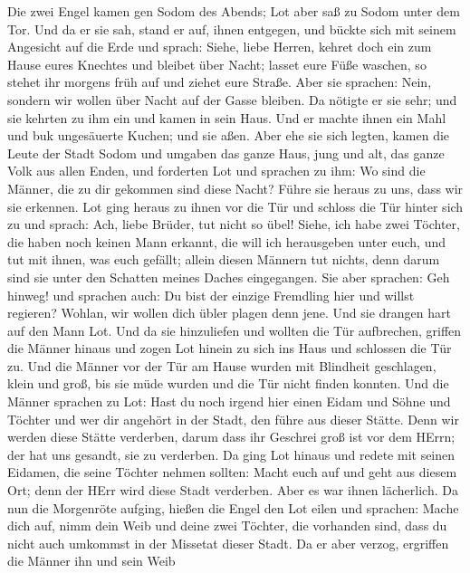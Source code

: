  Die zwei Engel kamen gen Sodom des Abends; Lot aber saß zu
Sodom unter dem Tor. Und da er sie sah, stand er auf, ihnen entgegen,
und bückte sich mit seinem Angesicht auf die Erde  und
sprach: Siehe, liebe Herren, kehret doch ein zum Hause eures Knechtes
und bleibet über Nacht; lasset eure Füße waschen, so stehet ihr morgens
früh auf und ziehet eure Straße. Aber sie sprachen: Nein, sondern wir
wollen über Nacht auf der Gasse bleiben.  Da nötigte er sie
sehr; und sie kehrten zu ihm ein und kamen in sein Haus. Und er machte
ihnen ein Mahl und buk ungesäuerte Kuchen; und sie aßen. 
Aber ehe sie sich legten, kamen die Leute der Stadt Sodom und umgaben
das ganze Haus, jung und alt, das ganze Volk aus allen Enden,
 und forderten Lot und sprachen zu ihm: Wo sind die Männer,
die zu dir gekommen sind diese Nacht? Führe sie heraus zu uns, dass wir
sie erkennen.  Lot ging heraus zu ihnen vor die Tür und
schloss die Tür hinter sich zu  und sprach: Ach, liebe
Brüder, tut nicht so übel!  Siehe, ich habe zwei Töchter,
die haben noch keinen Mann erkannt, die will ich herausgeben unter euch,
und tut mit ihnen, was euch gefällt; allein diesen Männern tut nichts,
denn darum sind sie unter den Schatten meines Daches eingegangen.
 Sie aber sprachen: Geh hinweg! und sprachen auch: Du bist
der einzige Fremdling hier und willst regieren? Wohlan, wir wollen dich
übler plagen denn jene. Und sie drangen hart auf den Mann Lot. Und da
sie hinzuliefen und wollten die Tür aufbrechen,  griffen
die Männer hinaus und zogen Lot hinein zu sich ins Haus und schlossen
die Tür zu.  Und die Männer vor der Tür am Hause wurden mit
Blindheit geschlagen, klein und groß, bis sie müde wurden und die Tür
nicht finden konnten.  Und die Männer sprachen zu Lot: Hast
du noch irgend hier einen Eidam und Söhne und Töchter und wer dir
angehört in der Stadt, den führe aus dieser Stätte.  Denn
wir werden diese Stätte verderben, darum dass ihr Geschrei groß ist vor
dem HErrn; der hat uns gesandt, sie zu verderben.  Da ging
Lot hinaus und redete mit seinen Eidamen, die seine Töchter nehmen
sollten: Macht euch auf und geht aus diesem Ort; denn der HErr wird
diese Stadt verderben. Aber es war ihnen lächerlich.  Da
nun die Morgenröte aufging, hießen die Engel den Lot eilen und sprachen:
Mache dich auf, nimm dein Weib und deine zwei Töchter, die vorhanden
sind, dass du nicht auch umkommst in der Missetat dieser Stadt.
 Da er aber verzog, ergriffen die Männer ihn und sein Weib

